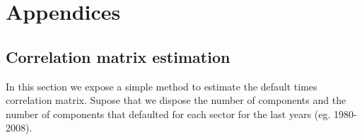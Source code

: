\documentclass[a4paper,12pt,final]{article}
\begin{document}

\newpage
\appendix
\section{Appendices}

\subsection{Correlation matrix estimation}
\label{ap:mcorrel}

In this section we expose a simple method to estimate the default times 
correlation matrix. Supose that we dispose the number of components and the 
number of components that defaulted for each sector for the last years (eg. 
1980-2008). 
\end{document}
